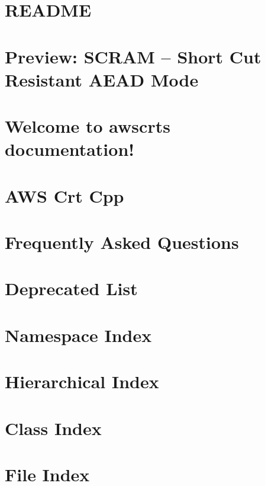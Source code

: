 \documentclass[twoside]{book}
\newcommand{\+}{\discretionary{\mbox{\scriptsize$\hookleftarrow$}}{}{}}
\begin{document}
\chapter{README}
\label{md_crt_aws_crt_cpp_crt_s2n__r_e_a_d_m_e}

\chapter{Preview\+: SCRAM -- Short Cut Resistant AEAD Mode}
\label{md_crt_aws_crt_cpp_crt_s2n_scram__r_e_a_d_m_e}

\chapter{Welcome to awscrt\textquotesingle{}s documentation!}
\label{md_crt_aws_crt_cpp_docsrc_index}

\chapter{AWS Crt Cpp}
\label{md_crt_aws_crt_cpp__r_e_a_d_m_e}

\chapter{Frequently Asked Questions}
\label{md__f_a_q}

\chapter{Deprecated List}
\label{deprecated}

\chapter{Namespace Index}

\chapter{Hierarchical Index}

\chapter{Class Index}

\chapter{File Index}

\end{document}
